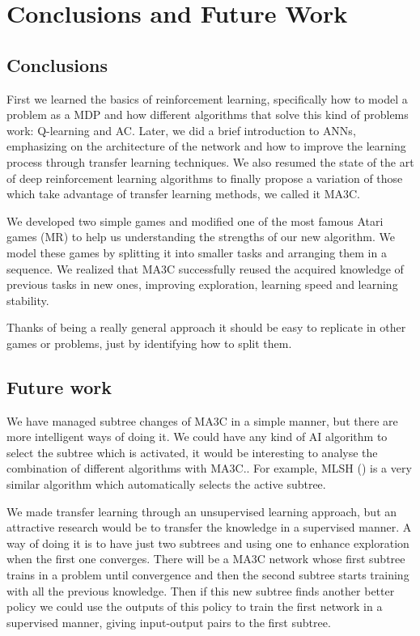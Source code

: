 \chapter{Conclusions and Future Work}
\section{Conclusions}
First we learned the basics of reinforcement learning, specifically how to model a problem as a \acl{MDP} and how different
algorithms that solve this kind of problems work: Q-learning and \acl{AC}.
Later, we did a brief introduction to \aclp{ANN}, emphasizing on the architecture of the network and how to improve
the learning process through transfer learning techniques.
We also resumed the state of the art of deep reinforcement learning algorithms to finally propose a variation of those
which take advantage of transfer learning methods, we called it \acl{MA3C}.

We developed two simple games and modified one of the most famous Atari games (\acl{MR}) to help us understanding the
strengths of our new algorithm.
We model these games by splitting it into smaller tasks and arranging them in a sequence.
We realized that \ac{MA3C} successfully reused the acquired knowledge of previous tasks in new ones, improving exploration,
learning speed and learning stability.

Thanks of being a really general approach it should be easy to replicate in other games or problems, just by identifying
how to split them.

\section{Future work}

We have managed subtree changes of \ac{MA3C} in a simple manner, but there are more intelligent ways of doing it.
We could have any kind of \ac{AI} algorithm to select the subtree which is activated, it would be interesting to analyse
the combination of different algorithms with \ac{MA3C}..
For example, MLSH (\cite{frans2017meta}) is a very similar algorithm which automatically selects the active subtree.

We made transfer learning through an unsupervised learning approach, but an attractive research would be to transfer the
knowledge in a supervised manner.
A way of doing it is to have just two subtrees and using one to enhance exploration when the first one converges.
There will be a \ac{MA3C} network whose first subtree trains in a problem until convergence and then the second subtree
starts training with all the previous knowledge.
Then if this new subtree finds another better policy we could use the outputs of this policy to train the first network
in a supervised manner, giving input-output pairs to the first subtree.


